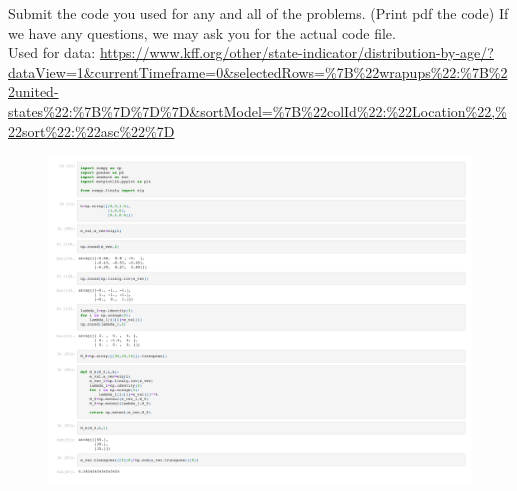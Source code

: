 \documentclass[addpoints, 11pt]{exam}
\begin{document}
\begin{questions}
\question Submit the code you used for any and all of the problems. (Print pdf the code) If we have any questions, we may ask you for the actual code file.\\
Used for data: \url{https://www.kff.org/other/state-indicator/distribution-by-age/?dataView=1&currentTimeframe=0&selectedRows=%7B%22wrapups%22:%7B%22united-states%22:%7B%7D%7D%7D&sortModel=%7B%22colId%22:%22Location%22,%22sort%22:%22asc%22%7D}\\
\begin{figure}[H]
\centering
\includegraphics[scale=0.4]{Math_142_Homework_3_Q_1-Copy1.pdf}	

\end{figure}
\end{questions}
\end{document}
